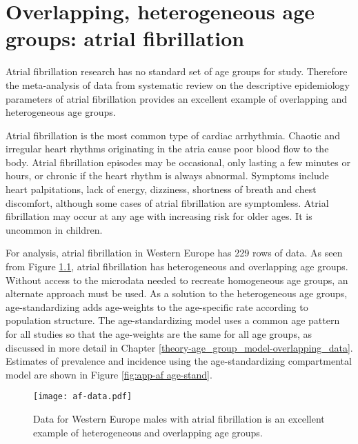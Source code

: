 \chapter{Overlapping, heterogeneous age groups: atrial fibrillation}
\label{applications-age_groups}

Atrial fibrillation research has no standard set of age groups for
study.  Therefore the meta-analysis of data from systematic review on
the descriptive epidemiology parameters of atrial fibrillation
provides an excellent example of overlapping and heterogeneous age
groups.

Atrial fibrillation is the most common type of cardiac arrhythmia.
Chaotic and irregular heart rhythms originating in the atria cause
poor blood flow to the body.  Atrial fibrillation episodes may be
occasional, only lasting a few minutes or hours, or chronic if the
heart rhythm is always abnormal.  Symptoms include heart palpitations,
lack of energy, dizziness, shortness of breath and chest discomfort,
although some cases of atrial fibrillation are symptomless.  Atrial
fibrillation may occur at any age with increasing risk for older ages.
It is uncommon in children. \cite{rich_epidemiology_2009,
  rho_asymptomoatic_2005, american_acc_2006, radford_atiral_1977}

For analysis, atrial fibrillation in Western Europe has 229 rows of
data.  As seen from Figure \ref{fig:app-af data}, atrial fibrillation
has heterogeneous and overlapping age groups.  Without access to the
microdata needed to recreate homogeneous age groups, an alternate
approach must be used.  As a solution to the heterogeneous age groups,
age-standardizing adds age-weights to the age-specific rate according
to population structure.  The age-standardizing model uses a common
age pattern for all studies so that the age-weights are the same for
all age groups, as discussed in more detail in Chapter
\ref{theory-age_group_model-overlapping_data}.  Estimates of
prevalence and incidence using the age-standardizing compartmental
model are shown in Figure \ref{fig:app-af age-stand}.

    \begin{figure}[h]
        \begin{center}
            \texttt{[image: af-data.pdf]}
            \caption{Data for Western Europe males with atrial
              fibrillation is an excellent example of heterogeneous
              and overlapping age groups.}
            \label{fig:app-af data}
        \end{center}
    \end{figure}

